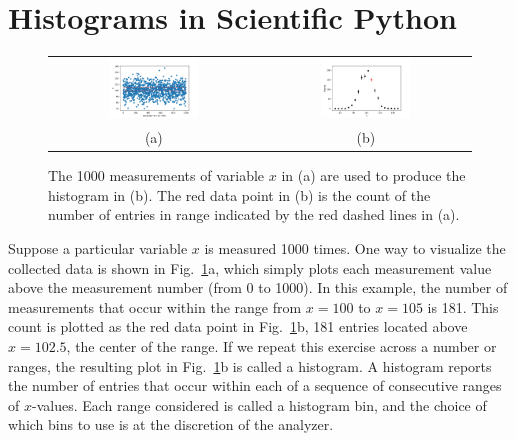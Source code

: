 \documentclass[12pt,oneside]{book}
\begin{document}
\section{Histograms in Scientific Python}

\begin{figure}[htbp]
\begin{center}
\begin{tabular}{cc}
{\includegraphics[width=0.45\textwidth]{figs/raw.pdf}} &
{\includegraphics[width=0.45\textwidth]{figs/histeg.pdf}} \\
(a) & (b) \\
\end{tabular}
\end{center}
\caption{\label{fig:histeg} The 1000 measurements of variable $x$ in (a) are used to produce the histogram in (b).  The red data point in (b) is the count of the number of entries in range indicated by the red dashed lines in (a).}
\end{figure}

Suppose a particular variable $x$ is measured 1000 times.  One way to visualize the collected data is shown in Fig.~\ref{fig:histeg}a, which simply plots each measurement value above the measurement number (from 0 to 1000).  In this example, the number of measurements that occur within the range from $x=100$ to $x=105$ is 181.  This count is plotted as the red data point in Fig.~\ref{fig:histeg}b, 181 entries located above $x=102.5$, the center of the range.  If we repeat this exercise across a number or ranges, the resulting plot in Fig.~\ref{fig:histeg}b is called a histogram.  A histogram reports the number of entries that occur within each of a sequence of consecutive ranges of $x$-values.  Each range considered is called a histogram  bin, and the choice of which bins to use is at the discretion of the analyzer.
\end{document}
